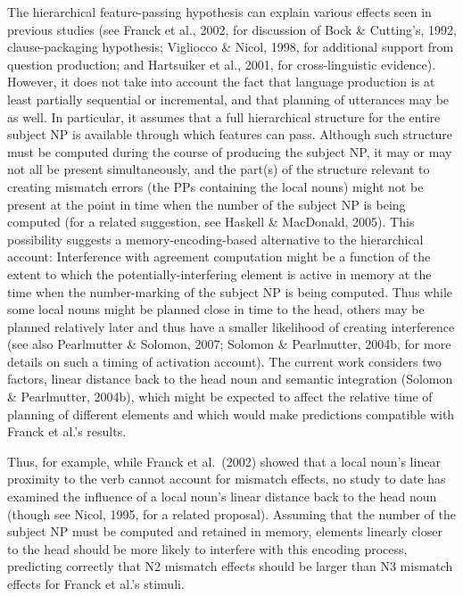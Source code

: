 \documentclass[12pt,titlepage]{article}
\begin{document}
The hierarchical feature-passing hypothesis can explain various effects
seen in previous studies (see Franck et al., 2002, for discussion of Bock
\& Cutting's, 1992, clause-packaging hypothesis; Vigliocco \& Nicol, 1998,
for additional support from question production; and Hartsuiker et al.,
2001, for cross-linguistic evidence).  However, it does not take into
account the fact that language production is at least partially sequential
or incremental, and that planning of utterances may be as well.  In
particular, it assumes that a full hierarchical structure for the entire
subject NP is available through which features can pass.  Although such
structure must be computed during the course of producing the subject NP,
it may or may not all be present simultaneously, and the part(s) of the
structure relevant to creating mismatch errors (the PPs containing the
local nouns) might not be present at the point in time when the number of
the subject NP is being computed (for a related suggestion, see Haskell \&
MacDonald, 2005).  This possibility suggests a memory-encoding-based
alternative to the hierarchical account: Interference with agreement
computation might be a function of the extent to which the
potentially-interfering element is active in memory at the time when the
number-marking of the subject NP is being computed.  Thus while some local
nouns might be planned close in time to the head, others may be planned
relatively later and thus have a smaller likelihood of creating
interference (see also Pearlmutter \& Solomon, 2007; Solomon \&
Pearlmutter, 2004b, for more details on such a timing of activation
account).  The current work considers two factors, linear distance back to
the head noun and semantic integration (Solomon \& Pearlmutter, 2004b),
which might be expected to affect the relative time of planning of
different elements and which would make predictions compatible with Franck
et al.'s results.

Thus, for example, while Franck et al.\ (2002) showed that a local noun's
linear proximity to the verb cannot account for mismatch effects, no study
to date has examined the influence of a local noun's linear distance back
to the head noun (though see Nicol, 1995, for a related proposal).
Assuming that the number of the subject NP must be computed and retained in
memory, elements linearly closer to the head should be more likely to
interfere with this encoding process, predicting correctly that N2 mismatch
effects should be larger than N3 mismatch effects for Franck et al.'s
stimuli.
\end{document}
